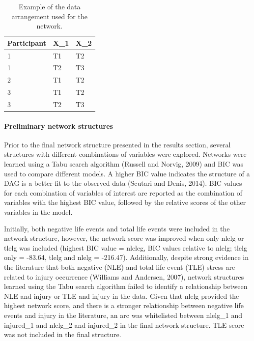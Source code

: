 \documentclass[
  english,
  man,floatsintext]{apa6}
\let\oldparagraph\paragraph
\renewcommand{\paragraph}[1]{\oldparagraph{#1}\mbox{}}
\begin{document}
\begin{table}[H]

\caption{\label{tab:table2}Example of the data arrangement used for the network.}
\centering
\begin{tabular}[t]{l|l|l}
\hline
\textbf{Participant} & \textbf{X\_1} & \textbf{X\_2}\\
\hline
1 & T1 & T2\\
\hline
1 & T2 & T3\\
\hline
2 & T1 & T2\\
\hline
3 & T1 & T2\\
\hline
3 & T2 & T3\\
\hline
\end{tabular}
\end{table}

\hypertarget{preliminary-network-structures}{%
\paragraph{Preliminary network structures}\label{preliminary-network-structures}}

Prior to the final network structure presented in the results section, several structures with different combinations of variables were explored. Networks were learned using a Tabu search algorithm (Russell and Norvig, 2009) and BIC was used to compare different models.
A higher BIC value indicates the structure of a DAG is a better fit to the observed data (Scutari and Denis, 2014). BIC values for each combination of variables of interest are reported as the combination of variables with the highest BIC value, followed by the relative scores of the other variables in the model.

Initially, both negative life events and total life events were included in the network structure, however, the network score was improved when only nlelg or tlelg was included (highest BIC value = nleleg, BIC values relative to nlelg; tlelg only = -83.64, tlelg and nlelg = -216.47).
Additionally, despite strong evidence in the literature that both negative (NLE) and total life event (TLE) stress are related to injury occurrence (Williams and Andersen, 2007), network structures learned using the Tabu search algorithm failed to identify a relationship between NLE and injury or TLE and injury in the data.
Given that nlelg provided the highest network score, and there is a stronger relationship between negative life events and injury in the literature, an arc was whitelisted between nlelg\_1 and injured\_1 and nlelg\_2 and injured\_2 in the final network structure. TLE score was not included in the final structure.
\end{document}
